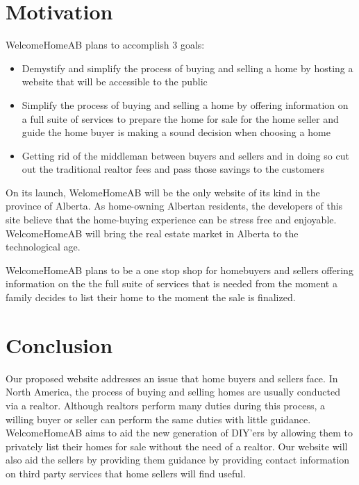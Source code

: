\documentclass[letterpaper,12pt]{article}
\begin{document}
\section{Motivation}

WelcomeHomeAB plans to accomplish 3 goals: 
\begin{itemize}
	\item Demystify and simplify the process of buying and selling a home by hosting a website that will be accessible to the public
	\item Simplify the process of buying and selling a home by offering information on a full suite of services to prepare the home for sale for the home seller and guide the home buyer is making a sound decision when choosing a home
	\item Getting rid of the middleman between buyers and sellers and in doing so cut out the traditional realtor fees and pass those savings to the customers
\end{itemize}

On its launch, WelomeHomeAB will be the only website of its kind in the province of Alberta. As home-owning Albertan residents, the developers of this site believe that the home-buying experience can be stress free and enjoyable. WelcomeHomeAB will bring the real estate market in Alberta to the technological age.

WelcomeHomeAB plans to be a one stop shop for homebuyers and sellers offering information on the the full suite of services that is needed from the moment a family decides to list their home to the moment the sale is finalized.


\section{Conclusion}
Our proposed website addresses an issue that home buyers and sellers face. In North America, the process of buying and selling homes are usually conducted via a realtor. Although realtors perform many duties during this process, a willing buyer or seller can perform the same duties with little guidance. WelcomeHomeAB aims to aid the new generation of DIY'ers by allowing them to privately list their homes for sale without the need of a realtor. Our website will also aid the sellers by providing them guidance by providing contact information on third party services that home sellers will find useful.
\end{document}
